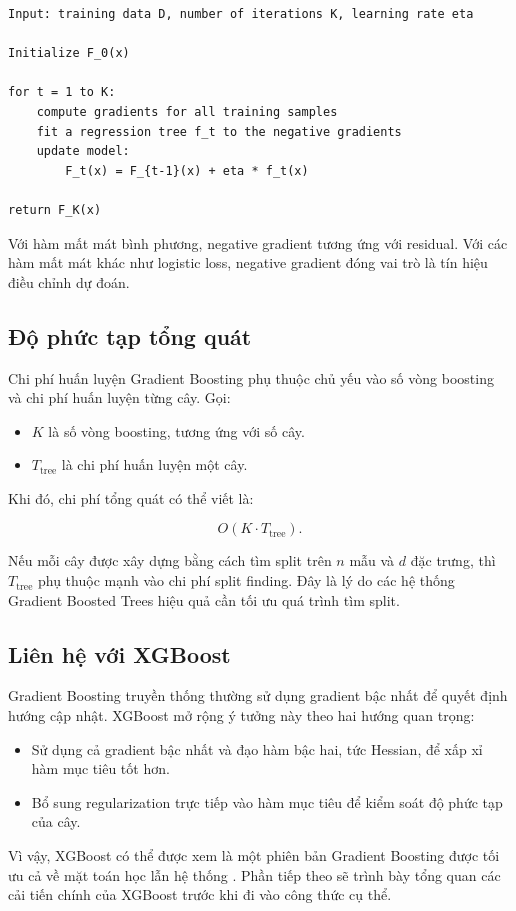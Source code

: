 \begin{lstlisting}[style=pseudocode, caption={Quy trình huấn luyện Gradient Boosting}, label={lst:gradient_boosting_training}]
Input: training data D, number of iterations K, learning rate eta

Initialize F_0(x)

for t = 1 to K:
    compute gradients for all training samples
    fit a regression tree f_t to the negative gradients
    update model:
        F_t(x) = F_{t-1}(x) + eta * f_t(x)

return F_K(x)
\end{lstlisting}

Với hàm mất mát bình phương, negative gradient tương ứng với residual. Với các hàm mất mát khác như logistic loss, negative gradient đóng vai trò là tín hiệu điều chỉnh dự đoán.

\subsection{Độ phức tạp tổng quát}

Chi phí huấn luyện Gradient Boosting phụ thuộc chủ yếu vào số vòng boosting và chi phí huấn luyện từng cây. Gọi:

\begin{itemize}
    \item $K$ là số vòng boosting, tương ứng với số cây.
    \item $T_{\text{tree}}$ là chi phí huấn luyện một cây.
\end{itemize}

Khi đó, chi phí tổng quát có thể viết là:

\[
O(K \cdot T_{\text{tree}}).
\]

Nếu mỗi cây được xây dựng bằng cách tìm split trên $n$ mẫu và $d$ đặc trưng, thì $T_{\text{tree}}$ phụ thuộc mạnh vào chi phí split finding. Đây là lý do các hệ thống Gradient Boosted Trees hiệu quả cần tối ưu quá trình tìm split.

\subsection{Liên hệ với XGBoost}

Gradient Boosting truyền thống thường sử dụng gradient bậc nhất để quyết định hướng cập nhật. XGBoost mở rộng ý tưởng này theo hai hướng quan trọng:

\begin{itemize}
    \item Sử dụng cả gradient bậc nhất và đạo hàm bậc hai, tức Hessian, để xấp xỉ hàm mục tiêu tốt hơn.
    \item Bổ sung regularization trực tiếp vào hàm mục tiêu để kiểm soát độ phức tạp của cây.
\end{itemize}

Vì vậy, XGBoost có thể được xem là một phiên bản Gradient Boosting được tối ưu cả về mặt toán học lẫn hệ thống \cite{chen2016xgboost}. Phần tiếp theo sẽ trình bày tổng quan các cải tiến chính của XGBoost trước khi đi vào công thức cụ thể.